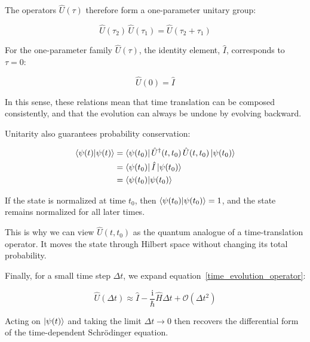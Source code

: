 The operators $\hat{U}(\tau)$ therefore form a one-parameter unitary group:

\begin{equation}
    \hat{U}(\tau_2)\,\hat{U}(\tau_1)=\hat{U}(\tau_2+\tau_1)
\label{time_evolution_group_property_tau}
\end{equation}

For the one-parameter family $\hat{U}(\tau)$, the identity element, $\hat{I}$, corresponds to $\tau=0$:

\begin{equation}
    \hat{U}(0)=\hat{I}
\label{time_evolution_identity}
\end{equation}

In this sense, these relations mean that time translation can be composed consistently, and that the evolution can always be undone by evolving backward.

Unitarity also guarantees probability conservation:

\begin{equation}
\begin{aligned}
    \braket{\psi(t)|\psi(t)}
    &= \bra{\psi(t_0)}\hat{U}^{\dagger}(t,t_0)\,\hat{U}(t,t_0)\ket{\psi(t_0)} \\
    &= \bra{\psi(t_0)}\hat{I}\ket{\psi(t_0)} \\
    &= \braket{\psi(t_0)|\psi(t_0)}
\end{aligned}
\label{time_evolution_norm_conservation}
\end{equation}

If the state is normalized at time $t_0$, then $\braket{\psi(t_0)|\psi(t_0)}=1$, and the state remains normalized for all later times.

This is why we can view $\hat{U}(t,t_0)$ as the quantum analogue of a time-translation operator.
It moves the state through Hilbert space without changing its total probability.

Finally, for a small time step $\Delta t$, we expand equation~\eqref{time_evolution_operator}:

\begin{equation}
    \hat{U}(\Delta t)\approx \hat{I}-\frac{\mathrm{i}}{\hbar}\hat{H}\Delta t+\mathcal{O}(\Delta t^2)
\label{time_evolution_short_time_series}
\end{equation}

Acting on $\ket{\psi(t)}$ and taking the limit $\Delta t\to 0$ then recovers the differential form of the time-dependent Schrödinger equation.

